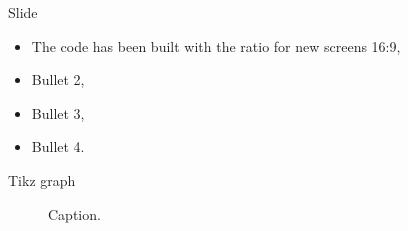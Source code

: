 



 
 
 
 
 

 
 




\ifx\currentAspect\oldAspect
	\def\sometext{The code has been built with the ratio for old screens 4:3}
\else
	\def\sometext{The code has been built with the ratio for new screens 16:9}
\fi



\begin{frame}{Slide }
\begin{itemize}
\setlength\itemsep{\fill}
\item \sometext,
\item Bullet 2,
\item Bullet 3,
\item Bullet 4.
\end{itemize}
\end{frame}


\begin{frame}{Tikz graph}
\begin{figure}[H]
\centering


\vspace{-10pt}
\caption{Caption.}
\end{figure}
\end{frame}


